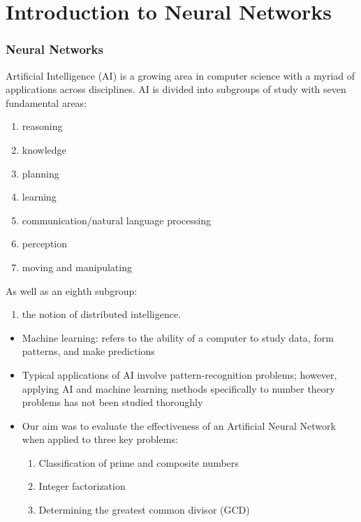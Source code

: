 \documentclass[8pt]{beamer}
\begin{document}
\section{Introduction to Neural Networks}

\begin{frame}
\frametitle{Neural Networks}

Artificial Intelligence (AI) is a growing area in computer science with a myriad of applications across disciplines.  AI is divided into subgroups of study with seven fundamental areas:
\begin{enumerate}
\item reasoning
\item knowledge
\item planning
\item learning
\item communication/natural language processing
\item perception
\item moving and manipulating
\end{enumerate}
As well as an eighth subgroup:
\begin{enumerate}[8.]
\item the notion of distributed intelligence.
\end{enumerate}
\end{frame}

\begin{frame}
\begin{itemize}
\item Machine learning: refers to the ability of a computer to study data, form patterns, and make predictions
\item Typical applications of AI involve pattern-recognition problems; however, applying AI and machine learning methods specifically to number theory problems has not been studied thoroughly
\item Our aim was to evaluate the effectiveness of an Artificial Neural Network when applied to three key problems:
\begin{enumerate}
\item Classification of prime and composite numbers
\item Integer factorization
\item Determining the greatest common divisor (GCD)
\end{enumerate}
\end{itemize}
\end{frame}
\end{document}
